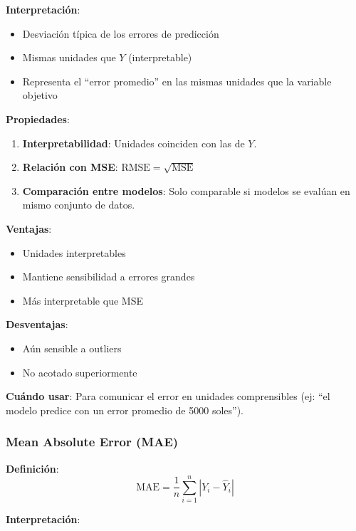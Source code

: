 \documentclass[
  doc,
  floatsintext,
  longtable,
  a4paper,
  nolmodern,
  notxfonts,
  notimes,
  12pt,
  colorlinks=true,linkcolor=blue,citecolor=blue,urlcolor=blue]{apa7}
\providecommand{\tightlist}{%
  \setlength{\itemsep}{0pt}\setlength{\parskip}{0pt}}
\begin{document}
\textbf{Interpretación}:

\begin{itemize}
\tightlist
\item
  Desviación típica de los errores de predicción
\item
  Mismas unidades que \(Y\) (interpretable)
\item
  Representa el ``error promedio'' en las mismas unidades que la
  variable objetivo
\end{itemize}

\textbf{Propiedades}:

\begin{enumerate}
\def\labelenumi{\arabic{enumi}.}
\item
  \textbf{Interpretabilidad}: Unidades coinciden con las de \(Y\).
\item
  \textbf{Relación con MSE}: \(\text{RMSE} = \sqrt{\text{MSE}}\)
\item
  \textbf{Comparación entre modelos}: Solo comparable si modelos se
  evalúan en mismo conjunto de datos.
\end{enumerate}

\textbf{Ventajas}:

\begin{itemize}
\tightlist
\item
  Unidades interpretables
\item
  Mantiene sensibilidad a errores grandes
\item
  Más interpretable que MSE
\end{itemize}

\textbf{Desventajas}:

\begin{itemize}
\tightlist
\item
  Aún sensible a outliers
\item
  No acotado superiormente
\end{itemize}

\textbf{Cuándo usar}: Para comunicar el error en unidades comprensibles
(ej: ``el modelo predice con un error promedio de 5000 soles'').

\subsubsection{Mean Absolute Error (MAE)}\label{mean-absolute-error-mae}

\textbf{Definición}: \[
\text{MAE} = \frac{1}{n} \sum_{i=1}^{n} |Y_i - \hat{Y}_i|
\]

\textbf{Interpretación}:
\end{document}
